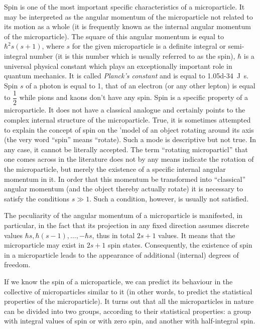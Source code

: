 \documentclass[a4paper,sfsidenotes,colorlinks=true]{tufte-book}
\numberwithin{equation}{section}
\numberwithin{figure}{section}
\begin{document}
Spin is one of the most important
specific characteristics of a microparticle. It may be interpreted as
the angular momentum of the microparticle not related to its motion as
a whole (it is frequently known as the internal angular momentum of
the microparticle). The square of this angular momentum is equal to
$\hbar^{2}s (s + 1)$, where $s$ for the given microparticle is a
definite integral or semi-integral number (it is this number which is
usually referred to as the spin), $\hbar$ is a universal physical
constant which plays an exceptionally important role in quantum
mechanics. It is called \emph{Planck's constant} and is equal to
\SI{1.05d-34}{ \joule\second}. Spin $s$ of a photon is equal to 1,
that of an electron (or any other lepton) is equal to $\dfrac{1}{2}$
while pions and kaons don't have any spin. 
Spin is a specific property of a microparticle. It does not have a
classical analogue and certainly points to the complex internal
structure of the microparticle. True, it is sometimes attempted to
explain the concept of spin on the 'model of an object rotating around
its axis (the very word ``spin'' means ``rotate). Such a mode is
descriptive but not true. In any case, it cannot be literally
accepted. The term ``rotating microparticl'' that one comes across in
the literature does not by any means indicate the rotation of the
microparticle, but merely the existence of a specific internal angular
momentum in it. In order that this momentum be transformed into
``classical'' angular momentum (and the object thereby actually
rotate) it is necessary to satisfy the conditions $s \gg 1$. Such a
condition, however, is usually not satisfied.

The peculiarity of the angular momentum of a microparticle is
manifested, in particular, in the fact that its projection in any
fixed direction assumes discrete values $\hbar s, \hbar (s -1 ),
\ldots , - \hbar s$, thus in total $2s + 1$ values. It means that the
microparticle may exist in $2s + 1$ spin states. Consequently, the
existence of spin in a microparticle leads to the appearance of
additional (internal) degrees of freedom.  

If we know the spin of a
microparticle, we can predict its behaviour in the collective of
microparticles similar to it (in other words, to predict the
statistical properties of the microparticle). It turns out that all
the microparticles in nature can be divided into two groups, according
to their statistical properties: a group with integral values of spin
or with zero spin, and another with half-integral spin.
\end{document}
